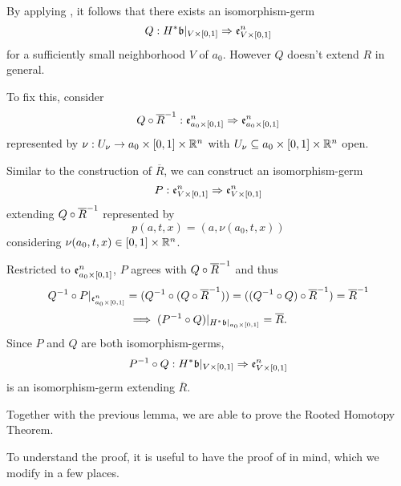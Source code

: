 \begin{myproof}
    By applying ,
    it follows that there exists an isomorphism-germ
    \[ \germdef{Q}{\ind{H}\bb[\cyl{V}]}{\be{\cyl{V}}} \]
    for a sufficiently small neighborhood $V$ of $a_0$.
    However $Q$ doesn't extend $R$ in general.

    To fix this, consider
    \[ Q \circ \overline{R}^{-1}: \mathfrak{e}^{n}_{a_0 \times{} [0, 1]} \Rightarrow{} \mathfrak{e}^{n}_{a_0 \times{} [0, 1]} \]
    represented by $\nu: U_\nu \to a_0 \times{} [0, 1] \times \mathbb{R}^n$
    with $U_\nu \subseteq{} a_0 \times{} [0, 1] \times \mathbb{R}^n$ open.

    Similar to the construction of $\overline{R}$, we can construct an isomorphism-germ
    \[ P: \mathfrak{e}^{n}_{V \times{} [0, 1]} \Rightarrow{} \mathfrak{e}^{n}_{V \times{} [0, 1]} \]
    extending $Q \circ \overline{R}^{-1}$ represented by
    \[ p(a, t, x) = (a, \nu(a_0, t, x)) \]
    considering $\nu(a_0, t, x) \in [0, 1] \times \mathbb{R}^n$.

    Restricted to $\mathfrak{e}^{n}_{a_0 \times{} [0, 1]}$, $P$ agrees with $Q \circ \overline{R}^{-1}$ and thus
    \[
        Q^{-1} \circ P\vert_{\mathfrak{e}^{n}_{a_0 \times{} [0, 1]}}
        = (Q^{-1} \circ (Q \circ \overline{R}^{-1}))
        = ((Q^{-1} \circ Q) \circ \overline{R}^{-1})
        = \overline{R}^{-1}
    \]
    \[ \implies (\inv{P} \circ Q)\restr{\ind{H}\bb[\cyl{a_0}]} = \overline{R}. \]
    Since $P$ and $Q$ are both isomorphism-germs,
    \[ \germdef{\inv{P} \circ Q}{\ind{H}\bb[\cyl{V}]}{\be{\cyl{V}}} \]
    is an isomorphism-germ extending $\overline{R}$.
\end{myproof}

\begin{myparagraph}
    Together with the previous lemma,
    we are able to prove the Rooted Homotopy Theorem.

    To understand the proof,
    it is useful to have the proof of  in mind,
    which we modify in a few places.
\end{myparagraph}

